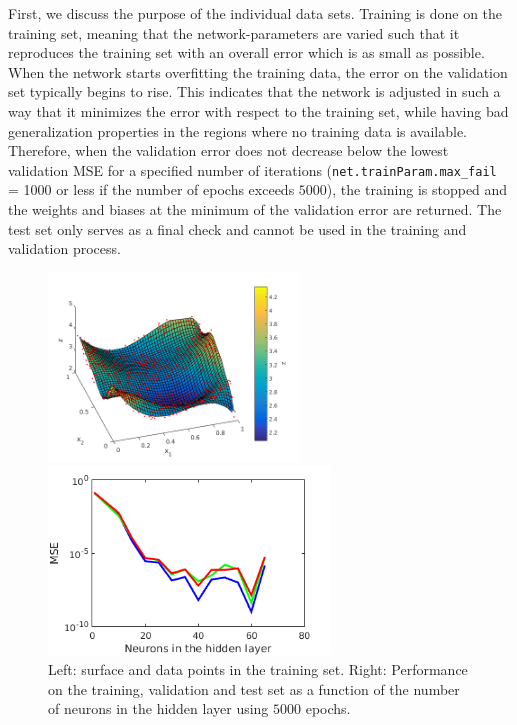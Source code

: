 \documentclass[pdftex,11pt,a4paper]{article}
\begin{document}
First, we discuss the purpose of the individual data sets. Training is done on the training set, meaning that the network-parameters are varied such that it reproduces the training set with an overall error which is as small as possible. When the network starts overfitting the training data, the error on the validation set typically begins to rise. This indicates that the network is adjusted in such a way that it minimizes the error with respect to the training set, while having bad generalization properties in the regions where no training data is available. Therefore, when the validation error does not decrease below the lowest validation MSE for a specified number of iterations (\texttt{net.trainParam.max\_fail} = 1000 or less if the number of epochs exceeds $5000$), the training is stopped and the weights and biases at the minimum of the validation error are returned. The test set only serves as a final check and cannot be used in the training and validation process.

\begin{figure}[tbh]
\centering
\begin{minipage}{0.4\textwidth}
\includegraphics[height=5cm]{figs/train_surface.png}
\end{minipage}\quad
\begin{minipage}{0.4\textwidth}
\includegraphics[height=5cm]{figs/performance_val.png}
\end{minipage}
\caption{Left: surface and data points in the training set. Right: Performance on the training, validation and test set as a function of the number of neurons in the hidden layer using $5000$ epochs. \label{fig:performance_val}}
\end{figure}
\end{document}
